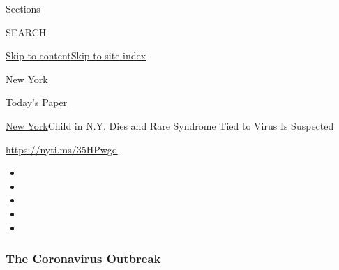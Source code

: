 Sections

SEARCH

\protect\hyperlink{site-content}{Skip to
content}\protect\hyperlink{site-index}{Skip to site index}

\href{https://www.nytimes3xbfgragh.onion/section/nyregion}{New York}

\href{https://myaccount.nytimes3xbfgragh.onion/auth/login?response_type=cookie\&client_id=vi}{}

\href{https://www.nytimes3xbfgragh.onion/section/todayspaper}{Today's
Paper}

\href{/section/nyregion}{New York}\textbar{}Child in N.Y. Dies and Rare
Syndrome Tied to Virus Is Suspected

\url{https://nyti.ms/35HPwgd}

\begin{itemize}
\item
\item
\item
\item
\item
\end{itemize}

\hypertarget{the-coronavirus-outbreak}{%
\subsubsection{\texorpdfstring{\href{https://www.nytimes3xbfgragh.onion/news-event/coronavirus?name=styln-coronavirus-national\&region=TOP_BANNER\&block=storyline_menu_recirc\&action=click\&pgtype=Article\&impression_id=88072ab0-f1e4-11ea-b365-5d61fca58ac4\&variant=undefined}{The
Coronavirus
Outbreak}}{The Coronavirus Outbreak}}\label{the-coronavirus-outbreak}}


